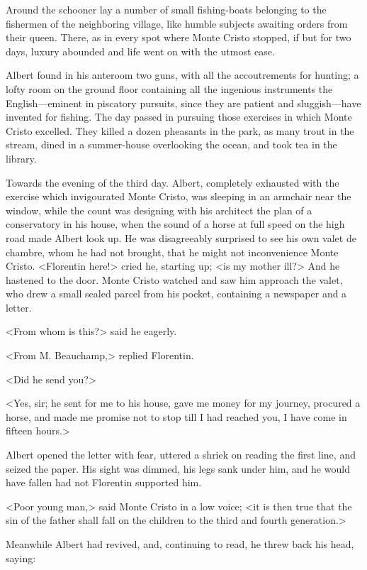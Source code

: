  Around the schooner lay a number of small fishing-boats belonging to the fishermen of the neighboring village, like humble subjects awaiting orders from their queen. There, as in every spot where Monte Cristo stopped, if but for two days, luxury abounded and life went on with the utmost ease. 

 Albert found in his anteroom two guns, with all the accoutrements for hunting; a lofty room on the ground floor containing all the ingenious instruments the English—eminent in piscatory pursuits, since they are patient and sluggish—have invented for fishing. The day passed in pursuing those exercises in which Monte Cristo excelled. They killed a dozen pheasants in the park, as many trout in the stream, dined in a summer-house overlooking the ocean, and took tea in the library. 

 Towards the evening of the third day. Albert, completely exhausted with the exercise which invigourated Monte Cristo, was sleeping in an armchair near the window, while the count was designing with his architect the plan of a conservatory in his house, when the sound of a horse at full speed on the high road made Albert look up. He was disagreeably surprised to see his own valet de chambre, whom he had not brought, that he might not inconvenience Monte Cristo.  <Florentin here!> cried he, starting up; <is my mother ill?> And he hastened to the door. Monte Cristo watched and saw him approach the valet, who drew a small sealed parcel from his pocket, containing a newspaper and a letter. 

 <From whom is this?> said he eagerly. 

 <From M. Beauchamp,> replied Florentin. 

 <Did he send you?> 

 <Yes, sir; he sent for me to his house, gave me money for my journey, procured a horse, and made me promise not to stop till I had reached you, I have come in fifteen hours.> 

 Albert opened the letter with fear, uttered a shriek on reading the first line, and seized the paper. His sight was dimmed, his legs sank under him, and he would have fallen had not Florentin supported him. 

 <Poor young man,> said Monte Cristo in a low voice; <it is then true that the sin of the father shall fall on the children to the third and fourth generation.> 

 Meanwhile Albert had revived, and, continuing to read, he threw back his head, saying: 


